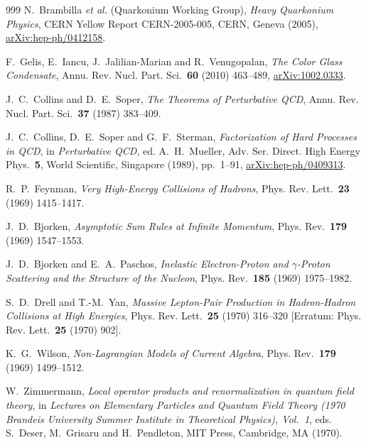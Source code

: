 \begin{thebibliography}{999}
N.~Brambilla \emph{et al.} (Quarkonium Working Group), \emph{Heavy Quarkonium Physics}, CERN Yellow Report CERN-2005-005, CERN, Geneva (2005), \href{https://arxiv.org/abs/hep-ph/0412158}{arXiv:hep-ph/0412158}.

F.~Gelis, E.~Iancu, J.~Jalilian-Marian and R.~Venugopalan, \emph{The Color Glass Condensate}, Annu. Rev. Nucl. Part. Sci.~\textbf{60} (2010) \mbox{463--489}, \href{https://arxiv.org/abs/1002.0333}{arXiv:1002.0333}.

J.~C.~Collins and D.~E.~Soper, \emph{The Theorems of Perturbative QCD}, Annu. Rev. Nucl. Part. Sci.~\textbf{37} (1987) \mbox{383--409}.

J.~C.~Collins, D.~E.~Soper and G.~F.~Sterman, \emph{Factorization of Hard Processes in QCD}, in \emph{Perturbative QCD}, ed. A.~H.~Mueller, Adv. Ser. Direct. High Energy Phys.~\textbf{5}, World Scientific, Singapore (1989), pp.~\mbox{1--91}, \href{https://arxiv.org/abs/hep-ph/0409313}{arXiv:hep-ph/0409313}.

R.~P.~Feynman, \emph{Very High-Energy Collisions of Hadrons}, Phys. Rev. Lett.~\textbf{23} (1969) \mbox{1415--1417}.

J.~D.~Bjorken, \emph{Asymptotic Sum Rules at Infinite Momentum}, Phys. Rev.~\textbf{179} (1969) \mbox{1547--1553}.

J.~D.~Bjorken and E.~A.~Paschos, \emph{Inelastic Electron-Proton and $\gamma$-Proton Scattering and the Structure of the Nucleon}, Phys. Rev.~\textbf{185} (1969) \mbox{1975--1982}.

S.~D.~Drell and T.-M.~Yan, \emph{Massive Lepton-Pair Production in Hadron-Hadron Collisions at High Energies}, Phys. Rev. Lett.~\textbf{25} (1970) \mbox{316--320} [Erratum: Phys. Rev. Lett.~\textbf{25} (1970) \mbox{902}].

K.~G.~Wilson, \emph{Non-Lagrangian Models of Current Algebra}, Phys. Rev.~\textbf{179} (1969) \mbox{1499--1512}.

W.~Zimmermann, \emph{Local operator products and renormalization in quantum field theory}, in \emph{Lectures on Elementary Particles and Quantum Field Theory (1970 Brandeis University Summer Institute in Theoretical Physics), Vol.~1}, eds. S.~Deser, M.~Grisaru and H.~Pendleton, MIT Press, Cambridge, MA (1970).


\end{thebibliography}
